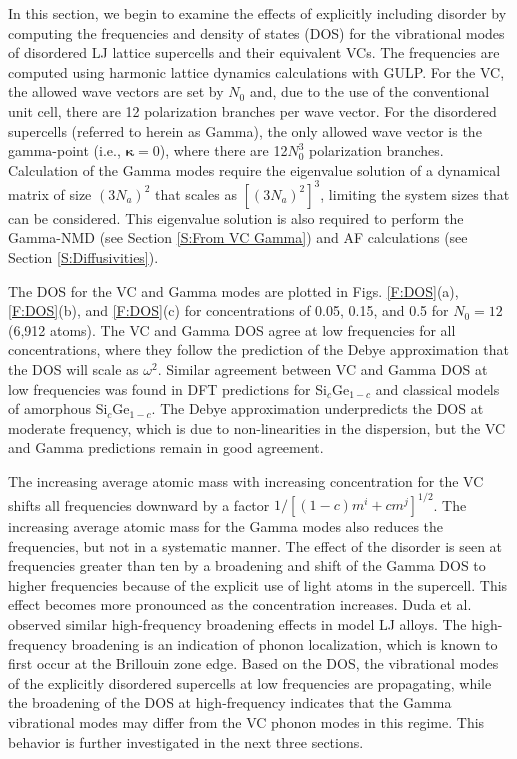 In this section, we begin to examine the effects of explicitly including 
disorder by computing the frequencies and density of states (DOS)  
for the vibrational modes of disordered LJ lattice supercells and their 
equivalent VCs. The frequencies 
are computed using harmonic lattice dynamics calculations with  
GULP.\cite{gale_general_2003}  For the 
VC, the allowed wave vectors are set by $N_0$ and, due to the use of the 
conventional unit cell, there are 12 
polarization branches per wave vector.  
For the disordered supercells (referred to herein as Gamma),
the only allowed wave vector is the gamma-point (i.e., $\pmb{\kappa}=0$),  
where there are 12$N_0^3$ polarization branches. Calculation of the 
Gamma modes require the eigenvalue solution of a dynamical matrix of size 
$(3N_a)^2$ that scales as $[(3N_a)^2]^3$, limiting the system 
sizes that can be considered. This eigenvalue solution is also 
required to perform the Gamma-NMD (see Section \ref{S:From VC Gamma})  
and AF calculations (see Section \ref{S:Diffusivities}). 

The DOS for the VC and Gamma modes are plotted in Figs. \ref{F:DOS}(a), 
\ref{F:DOS}(b), and \ref{F:DOS}(c) 
for concentrations of 0.05, 0.15, and 0.5 for 
$N_0=12$ (6,912 atoms). The VC and Gamma DOS 
agree at low frequencies for all concentrations, 
where they follow the prediction of the Debye approximation that 
the DOS will scale as $\omega^2$.\cite{ashcroft_solid_1976} 
Similar agreement between VC and Gamma DOS at low frequencies 
was found in DFT predictions 
for Si$_c$Ge$_{1-c}$\cite{garg_role_2011} and 
classical models of amorphous Si$_c$Ge$_{1-c}$.
\cite{bouchard_vibrational_1988} The Debye approximation 
underpredicts the DOS at moderate frequency, which is due to 
non-linearities in the dispersion,\cite{ashcroft_solid_1976} but the 
VC and Gamma predictions remain in good agreement. 

The increasing average atomic  
mass with increasing concentration for the VC shifts all   
frequencies downward by a factor $1/[(1-c)m^i + cm^j]^{1/2}$. 
The increasing average atomic 
mass for the Gamma modes also reduces the frequencies, but not in a 
systematic manner. 
The effect of the disorder is seen at frequencies greater than 
ten by a broadening and shift of the Gamma DOS to higher frequencies 
because of the explicit use of light atoms in the supercell. This effect 
becomes more pronounced as the concentration increases.  
Duda et al. 
observed similar high-frequency broadening effects in model LJ alloys.
\cite{duda_reducing_2011} The high-frequency broadening is an indication 
of phonon localization, which is known to first occur at the 
Brillouin zone edge.\cite{chu_effect_1989} 
Based on the DOS, the vibrational modes of the explicitly disordered 
supercells at low frequencies are propagating, while the 
broadening of the DOS at high-frequency indicates that the Gamma 
vibrational modes may differ from the VC phonon modes in this regime. 
This behavior is further investigated in the next three sections. 

